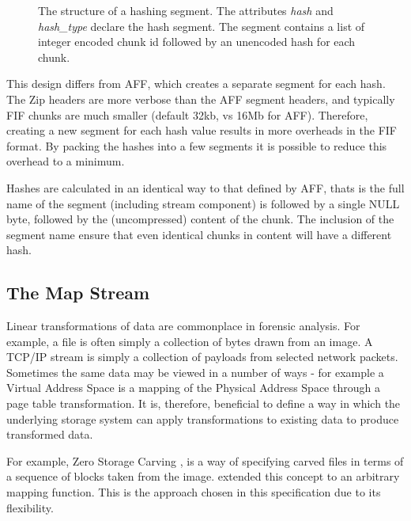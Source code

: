 \documentclass[10pt, conference]{IEEEtran}
\begin{document}
\begin{figure}[tb]
  \begin{center}
  \mbox{\columnwidth {}}

  \caption{The structure of a hashing segment. The attributes {\em
  hash} and {\em hash\_type} declare the hash segment. The segment
  contains a list of integer encoded chunk id followed by an unencoded
  hash for each chunk.}

  \label{hash_index}
  \end{center}
\end{figure}

This design differs from AFF, which creates a separate segment for
each hash. The Zip headers are more verbose than the AFF segment
headers, and typically FIF chunks are much smaller (default 32kb, vs
16Mb for AFF). Therefore, creating a new segment for each hash value
results in more overheads in the FIF format. By packing the hashes
into a few segments it is possible to reduce this overhead to a
minimum.

Hashes are calculated in an identical way to that defined by AFF,
thats is the full name of the segment (including stream component) is
followed by a single NULL byte, followed by the (uncompressed) content
of the chunk. The inclusion of the segment name ensure that even
identical chunks in content will have a different hash.

\subsection{The Map Stream}
\label{map_stream}
Linear transformations of data are commonplace in forensic
analysis. For example, a file is often simply a collection of bytes
drawn from an image. A TCP/IP stream is simply a collection of
payloads from selected network packets. Sometimes the same data may be
viewed in a number of ways - for example a Virtual Address Space is a
mapping of the Physical Address Space through a page table
transformation. It is, therefore, beneficial to define a way in which
the underlying storage system can apply transformations to existing
data to produce transformed data.

For example, Zero Storage Carving \cite{Meijer2006}, is a way of
specifying carved files in terms of a sequence of blocks taken from
the image. \cite{Cohen2007} extended this concept to an arbitrary
mapping function. This is the approach chosen in this specification
due to its flexibility. 
\end{document}
